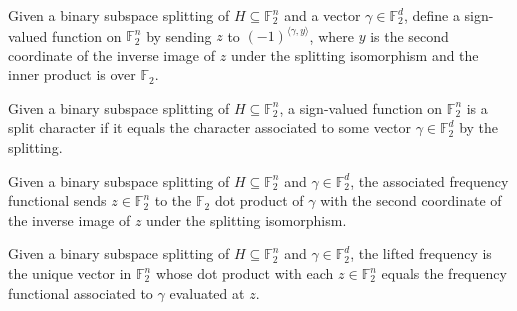 \begin{definition}
\label{FABL.BinarySubspaceSplit.character}
\leanok
{}
Given a binary subspace splitting of $H\subseteq\mathbb{F}_2^n$ and a vector
$\gamma\in\mathbb{F}_2^d$, define a sign-valued function on $\mathbb{F}_2^n$ by sending $z$ to
$(-1)^{\langle\gamma,y\rangle}$, where $y$ is the second coordinate of the inverse image
of $z$ under the splitting isomorphism and the inner product is over $\mathbb{F}_2$.
\end{definition}

\begin{definition}
\label{FABL.IsSplitCharacter}
\leanok
{}
Given a binary subspace splitting of $H\subseteq\mathbb{F}_2^n$, a sign-valued function on
$\mathbb{F}_2^n$ is a split character if it equals the character associated to some vector
$\gamma\in\mathbb{F}_2^d$ by the splitting.
\end{definition}

\begin{definition}
\label{FABL.BinarySubspaceSplit.frequencyFunctional}
\leanok
{}
Given a binary subspace splitting of $H\subseteq\mathbb{F}_2^n$ and $\gamma\in\mathbb{F}_2^d$, the
associated frequency functional sends $z\in\mathbb{F}_2^n$ to the $\mathbb{F}_2$ dot product of
$\gamma$ with the second coordinate of the inverse image of $z$ under the splitting
isomorphism.
\end{definition}

\begin{definition}
\label{FABL.BinarySubspaceSplit.liftFrequency}
\leanok
{}
Given a binary subspace splitting of $H\subseteq\mathbb{F}_2^n$ and $\gamma\in\mathbb{F}_2^d$, the
lifted frequency is the unique vector in $\mathbb{F}_2^n$ whose dot product with each
$z\in\mathbb{F}_2^n$ equals the frequency functional associated to $\gamma$ evaluated at $z$.
\end{definition}

